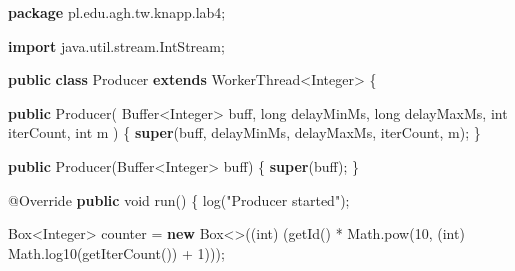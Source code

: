 \documentclass[11pt]{article}
\newenvironment{Shaded}{}{}
\newcommand{\KeywordTok}[1]{\textcolor[rgb]{0.00,0.44,0.13}{\textbf{{#1}}}}
\newcommand{\DataTypeTok}[1]{\textcolor[rgb]{0.56,0.13,0.00}{{#1}}}
\newcommand{\DecValTok}[1]{\textcolor[rgb]{0.25,0.63,0.44}{{#1}}}
\newcommand{\StringTok}[1]{\textcolor[rgb]{0.25,0.44,0.63}{{#1}}}
\newcommand{\FunctionTok}[1]{\textcolor[rgb]{0.02,0.16,0.49}{{#1}}}
\newcommand{\NormalTok}[1]{{#1}}
\newcommand{\ImportTok}[1]{{#1}}
\newcommand{\OperatorTok}[1]{\textcolor[rgb]{0.40,0.40,0.40}{{#1}}}
\newcommand{\BuiltInTok}[1]{{#1}}
\newcommand{\AttributeTok}[1]{\textcolor[rgb]{0.49,0.56,0.16}{{#1}}}
\begin{document}
\begin{Shaded}
\begin{Highlighting}[]
\KeywordTok{package}\ImportTok{ pl}\OperatorTok{.}\ImportTok{edu}\OperatorTok{.}\ImportTok{agh}\OperatorTok{.}\ImportTok{tw}\OperatorTok{.}\ImportTok{knapp}\OperatorTok{.}\ImportTok{lab4}\OperatorTok{;}

\KeywordTok{import} \ImportTok{java}\OperatorTok{.}\ImportTok{util}\OperatorTok{.}\ImportTok{stream}\OperatorTok{.}\ImportTok{IntStream}\OperatorTok{;}

\KeywordTok{public} \KeywordTok{class}\NormalTok{ Producer }\KeywordTok{extends}\NormalTok{ WorkerThread}\OperatorTok{\textless{}}\BuiltInTok{Integer}\OperatorTok{\textgreater{}} \OperatorTok{\{}

    \KeywordTok{public} \FunctionTok{Producer}\OperatorTok{(}
            \BuiltInTok{Buffer}\OperatorTok{\textless{}}\BuiltInTok{Integer}\OperatorTok{\textgreater{}}\NormalTok{ buff}\OperatorTok{,}
            \DataTypeTok{long}\NormalTok{ delayMinMs}\OperatorTok{,} \DataTypeTok{long}\NormalTok{ delayMaxMs}\OperatorTok{,}
            \DataTypeTok{int}\NormalTok{ iterCount}\OperatorTok{,} \DataTypeTok{int}\NormalTok{ m}
    \OperatorTok{)} \OperatorTok{\{}
        \KeywordTok{super}\OperatorTok{(}\NormalTok{buff}\OperatorTok{,}\NormalTok{ delayMinMs}\OperatorTok{,}\NormalTok{ delayMaxMs}\OperatorTok{,}\NormalTok{ iterCount}\OperatorTok{,}\NormalTok{ m}\OperatorTok{);}
    \OperatorTok{\}}

    \KeywordTok{public} \FunctionTok{Producer}\OperatorTok{(}\BuiltInTok{Buffer}\OperatorTok{\textless{}}\BuiltInTok{Integer}\OperatorTok{\textgreater{}}\NormalTok{ buff}\OperatorTok{)} \OperatorTok{\{}
        \KeywordTok{super}\OperatorTok{(}\NormalTok{buff}\OperatorTok{);}
    \OperatorTok{\}}

    \AttributeTok{@Override}
    \KeywordTok{public} \DataTypeTok{void} \FunctionTok{run}\OperatorTok{()} \OperatorTok{\{}
        \FunctionTok{log}\OperatorTok{(}\StringTok{"Producer started"}\OperatorTok{);}

        \BuiltInTok{Box}\OperatorTok{\textless{}}\BuiltInTok{Integer}\OperatorTok{\textgreater{}}\NormalTok{ counter }\OperatorTok{=}
            \KeywordTok{new} \BuiltInTok{Box}\OperatorTok{\textless{}\textgreater{}((}\DataTypeTok{int}\OperatorTok{)} \OperatorTok{(}\FunctionTok{getId}\OperatorTok{()} \OperatorTok{*} \BuiltInTok{Math}\OperatorTok{.}\FunctionTok{pow}\OperatorTok{(}\DecValTok{10}\OperatorTok{,} \OperatorTok{(}\DataTypeTok{int}\OperatorTok{)} \BuiltInTok{Math}\OperatorTok{.}\FunctionTok{log10}\OperatorTok{(}\FunctionTok{getIterCount}\OperatorTok{())} \OperatorTok{+} \DecValTok{1}\OperatorTok{)));}


\end{Highlighting}
\end{Shaded}
\end{document}

